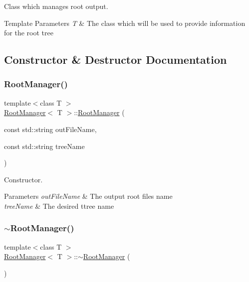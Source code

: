 Class which manages root output. 


\begin{DoxyTemplParams}{Template Parameters}
{\em T} & The class which will be used to provide information for the root tree \\
\hline
\end{DoxyTemplParams}


\subsection{Constructor \& Destructor Documentation}
\mbox{\label{class_root_manager_a152803255b94d68cbe4c4f8e24fc2352}} 
\subsubsection{\texorpdfstring{Root\+Manager()}{RootManager()}}
{\footnotesize\ttfamily template$<$class T $>$ \\
\hyperlink{class_root_manager}{Root\+Manager}$<$ T $>$\+::\hyperlink{class_root_manager}{Root\+Manager} (\begin{DoxyParamCaption}\item[{const std\+::string}]{out\+File\+Name,  }\item[{const std\+::string}]{tree\+Name }\end{DoxyParamCaption})}



Constructor. 


\begin{DoxyParams}{Parameters}
{\em out\+File\+Name} & The output root files name \\
\hline
{\em tree\+Name} & The desired ttree name \\
\hline
\end{DoxyParams}
\mbox{\label{class_root_manager_a68a189a7705b9da1da82a95ef9840d61}} 
\subsubsection{\texorpdfstring{$\sim$\+Root\+Manager()}{~RootManager()}}
{\footnotesize\ttfamily template$<$class T $>$ \\
\hyperlink{class_root_manager}{Root\+Manager}$<$ T $>$\+::$\sim$\hyperlink{class_root_manager}{Root\+Manager} (\begin{DoxyParamCaption}{ }\end{DoxyParamCaption})}



